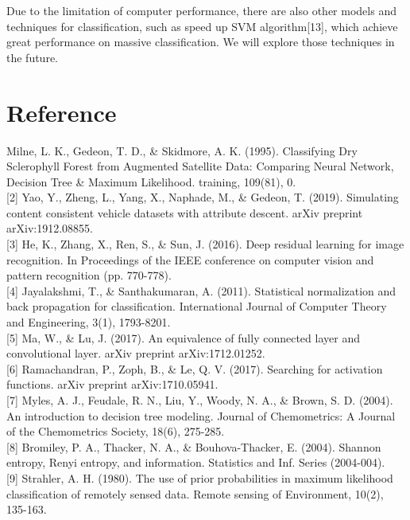 \documentclass[runningheads]{llncs}
\begin{document}
Due to the limitation of computer performance, there are also other models and techniques for classification, such as speed up SVM algorithm[13], which achieve great performance on massive classification. We will explore those techniques in the future.


\section{Reference}

\quad[1] Milne, L. K., Gedeon, T. D., \& Skidmore, A. K. (1995). Classifying Dry Sclerophyll Forest from Augmented Satellite Data: Comparing Neural Network, Decision Tree \& Maximum Likelihood. training, 109(81), 0.\\

[2] Yao, Y., Zheng, L., Yang, X., Naphade, M., \& Gedeon, T. (2019). Simulating content consistent vehicle datasets with attribute descent. arXiv preprint arXiv:1912.08855.\\

[3] He, K., Zhang, X., Ren, S., \& Sun, J. (2016). Deep residual learning for image recognition. In Proceedings of the IEEE conference on computer vision and pattern recognition (pp. 770-778).\\

[4] Jayalakshmi, T., \& Santhakumaran, A. (2011). Statistical normalization and back propagation for classification. International Journal of Computer Theory and Engineering, 3(1), 1793-8201.\\

[5] Ma, W., \& Lu, J. (2017). An equivalence of fully connected layer and convolutional layer. arXiv preprint arXiv:1712.01252.\\

[6] Ramachandran, P., Zoph, B., \& Le, Q. V. (2017). Searching for activation functions. arXiv preprint arXiv:1710.05941.\\

[7] Myles, A. J., Feudale, R. N., Liu, Y., Woody, N. A., \& Brown, S. D. (2004). An introduction to decision tree modeling. Journal of Chemometrics: A Journal of the Chemometrics Society, 18(6), 275-285.\\

[8] Bromiley, P. A., Thacker, N. A., \& Bouhova-Thacker, E. (2004). Shannon entropy, Renyi entropy, and information. Statistics and Inf. Series (2004-004).\\

[9] Strahler, A. H. (1980). The use of prior probabilities in maximum likelihood classification of remotely sensed data. Remote sensing of Environment, 10(2), 135-163.\\
\end{document}
